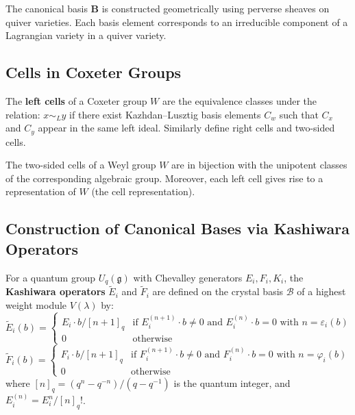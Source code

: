 \begin{theorem}[Lusztig, 1990]
The canonical basis $\mathbf{B}$ is constructed geometrically using perverse sheaves on quiver varieties. Each basis element corresponds to an irreducible component of a Lagrangian variety in a quiver variety.
\end{theorem}

\subsection{Cells in Coxeter Groups}

\begin{definition}[Cells]
The \textbf{left cells} of a Coxeter group $W$ are the equivalence classes under the relation: $x \sim_L y$ if there exist Kazhdan--Lusztig basis elements $C_w$ such that $C_x$ and $C_y$ appear in the same left ideal. Similarly define right cells and two-sided cells.
\end{definition}

\begin{theorem}[Lusztig, 1980s]
The two-sided cells of a Weyl group $W$ are in bijection with the unipotent classes of the corresponding algebraic group. Moreover, each left cell gives rise to a representation of $W$ (the cell representation).
\end{theorem}

\subsection{Construction of Canonical Bases via Kashiwara Operators}

\begin{definition}
For a quantum group $U_q(\mathfrak{g})$ with Chevalley generators $E_i, F_i, K_i$, the \textbf{Kashiwara operators} $\tilde{E}_i$ and $\tilde{F}_i$ are defined on the crystal basis $\mathcal{B}$ of a highest weight module $V(\lambda)$ by:
\[
\tilde{E}_i(b) = \begin{cases} E_i \cdot b / [n+1]_q & \text{if } E_i^{(n+1)} \cdot b \neq 0 \text{ and } E_i^{(n)} \cdot b = 0 \text{ with } n = \varepsilon_i(b) \\ 0 & \text{otherwise} \end{cases}
\]
\[
\tilde{F}_i(b) = \begin{cases} F_i \cdot b / [n+1]_q & \text{if } F_i^{(n+1)} \cdot b \neq 0 \text{ and } F_i^{(n)} \cdot b = 0 \text{ with } n = \varphi_i(b) \\ 0 & \text{otherwise} \end{cases}
\]
where $[n]_q = (q^n - q^{-n})/(q - q^{-1})$ is the quantum integer, and $E_i^{(n)} = E_i^n/[n]_q!$.
\end{definition}

